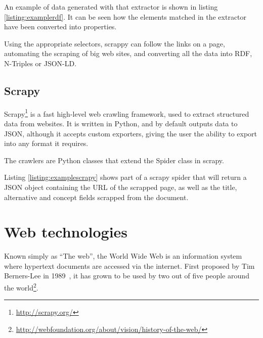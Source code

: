 An example of data generated with that extractor is shown in listing \ref{listing:examplerdf}. It can be seen how the elements matched in the extractor have been converted into properties. 

\begin{center}
  
\end{center}

Using the appropriate selectors, scrappy can follow the links on a page, automating the scraping of big web sites, and converting all the data into \ac{RDF}, N-Triples or JSON-LD.

\subsection{Scrapy}

Scrapy\footnote{\url{http://scrapy.org/}} is a fast high-level web crawling framework, used to extract structured data from websites. It is written in Python, and by default outputs data to JSON, although it accepts custom exporters, giving the user the ability to export into any format it requires.

The crawlers are Python classes that extend the Spider class in scrapy.

\begin{center}
  
\end{center}

Listing \ref{listing:examplescrapy} shows part of a scrapy spider that will return a JSON object containing the URL of the scrapped page, as well as the title, alternative and concept fields scrapped from the document.

\section{Web technologies}


Known simply as ``The web'', the World Wide Web is an information system where hypertext documents are accessed via the internet. First proposed by Tim Berners-Lee in 1989~\cite{berners1989information}, it has grown to be used by two out of five people around the world\footnote{\url{http://webfoundation.org/about/vision/history-of-the-web/}}.

